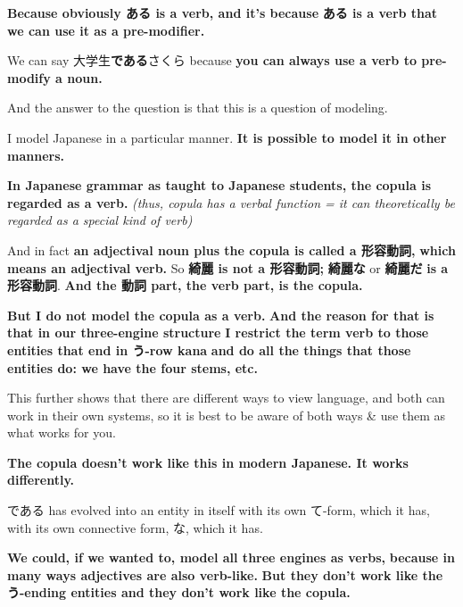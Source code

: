 {\bf Because obviously ある is a verb, and it's because} {\bf ある is a verb that we can use it as a pre-modifier.}

{}

We can say 大学生{\bf である}さくら because {\bf you can always use a verb to pre-modify a noun.}

And the answer to the question is that this is a question of modeling.

I model Japanese in a particular manner. {\bf It is possible to model it in other manners.}

{\bf In Japanese grammar as taught to Japanese students, the copula is regarded as a verb.} {\em (thus, copula has a verbal function = it can theoretically be regarded as a special kind of verb)}

\startplacetable[location=none]
\startxtable
\startxtablehead[head]
\stopxtablehead
\startxtablebody[body]
\startxrow
\startxcell[width={0.06\textwidth}] And in fact {\bf an adjectival noun plus the copula is called a 形容動詞,} {\bf which means an adjectival verb.} \stopxcell
\stopxrow
\startxrow
{} \stopxcell
\stopxrow
\startxrowgroup[lastrow]
\startxrow
\startxcell[width={0.06\textwidth}] So {\bf 綺麗 is not a 形容動詞;} {\bf 綺麗な} or {\bf 綺麗だ} {\bf is a 形容動詞}. {\bf And the 動詞 part, the verb part, is the copula.} \stopxcell
\stopxrow
\stopxrowgroup
\stopxtablebody
\startxtablefoot[foot]
\stopxtablefoot
\stopxtable
\stopplacetable

{\bf But I do not model the copula as a verb.} {\bf And the reason for that is that in our three-engine structure} {\bf I restrict the term verb to those entities that end in う-row kana} {\bf and do all the things that those entities do: we have the four stems, etc.}

{}

This further shows that there are different ways to view language, and both can work in their own systems, so it is best to be aware of both ways & use them as what works for you.

{\bf The copula doesn't work like this in modern Japanese. It works differently.}

である has evolved into an entity in itself with its own て-form, which it has, with its own connective form, な, which it has.

{\bf We could, if we wanted to, model all three engines as verbs,} {\bf because in many ways adjectives are also verb-like.} {\bf But they don't work like the う-ending entities and they don't work like the copula.}

